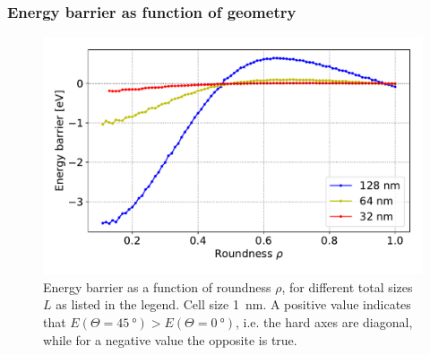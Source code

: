 \documentclass[11pt,a4paper,english,twoside]{article}
\begin{document}
\subsubsection{Energy barrier as function of geometry}
\begin{figure}
    \centering
    \includegraphics[width=0.9\columnwidth]{Figures/biaxial_island/Barrier/Plus_32,64,128_0.1-1_aPi128_B0.01_cell1nm.pdf}
    \caption{Energy barrier as a function of roundness $\rho$, for different total sizes $L$ as listed in the legend. Cell size \SI{1}{\nano\metre}. A positive value indicates that $E(\Theta=\SI{45}{\degree}) > E(\Theta=\SI{0}{\degree})$, i.e. the hard axes are diagonal, while for a negative value the opposite is true.}
    \label{fig:barrier-roundness}
\end{figure}
\end{document}
